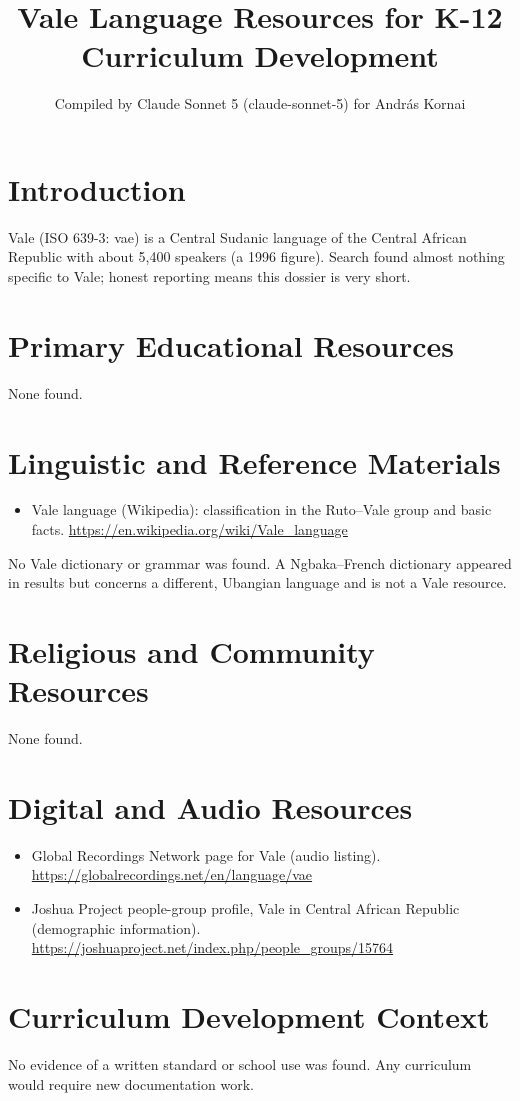 \documentclass[12pt]{article}
\title{Vale Language Resources for K-12 Curriculum Development}
\author{Compiled by Claude Sonnet 5 (claude-sonnet-5) for Andr\'as Kornai}
\date{}
\begin{document}
\maketitle
\section{Introduction}
Vale (ISO 639-3: vae) is a Central Sudanic language of the Central African Republic with about 5,400 speakers (a 1996 figure). Search found almost nothing specific to Vale; honest reporting means this dossier is very short.
\section{Primary Educational Resources}
None found.
\section{Linguistic and Reference Materials}
\begin{itemize}
\item Vale language (Wikipedia): classification in the Ruto--Vale group and basic facts. \url{https://en.wikipedia.org/wiki/Vale_language}
\end{itemize}
No Vale dictionary or grammar was found. A Ngbaka--French dictionary appeared in results but concerns a different, Ubangian language and is not a Vale resource.
\section{Religious and Community Resources}
None found.
\section{Digital and Audio Resources}
\begin{itemize}
\item Global Recordings Network page for Vale (audio listing). \url{https://globalrecordings.net/en/language/vae}
\item Joshua Project people-group profile, Vale in Central African Republic (demographic information). \url{https://joshuaproject.net/index.php/people_groups/15764}
\end{itemize}
\section{Curriculum Development Context}
No evidence of a written standard or school use was found. Any curriculum would require new documentation work.
\end{document}
